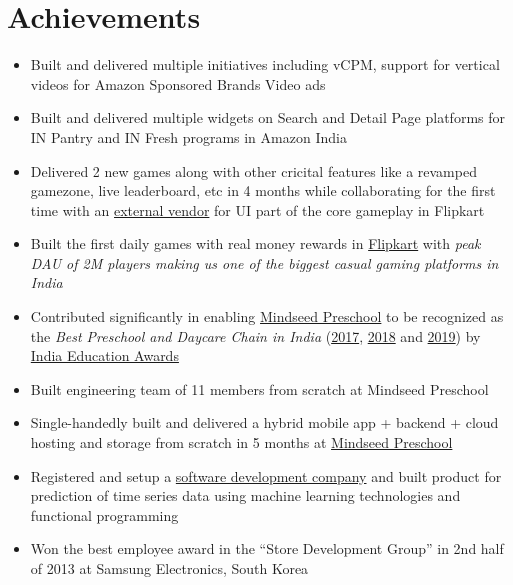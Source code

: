 \documentclass[11pt,a4paper,sans]{moderncv} %
\newcommand\Colorhref[3][blue]{\href{#2}{\small\color{#1}#3}}
\begin{document}
\section{Achievements}
\begin{itemize}
\item Built and delivered multiple initiatives including vCPM, support for vertical videos for Amazon Sponsored Brands Video ads
\item Built and delivered multiple widgets on Search and Detail Page platforms for IN Pantry and IN Fresh programs in Amazon India
\item Delivered 2 new games along with other cricital features like a revamped gamezone, live leaderboard, etc in 4 months while collaborating for the first time with an \Colorhref{https://www.juegostudio.com/}{external vendor} for UI part of the core gameplay in Flipkart
\item Built the first daily games with real money rewards in \Colorhref{https://www.flipkart.com}{Flipkart} with \textit{peak DAU of 2M players making us one of the biggest casual gaming platforms in India}
\item Contributed significantly in enabling \Colorhref{https://blog.mindseed.in}{Mindseed Preschool} to be recognized as the \textit{Best Preschool and Daycare Chain in India} (\Colorhref{http://epaperbeta.timesofindia.com/Article.aspx?eid=31804&articlexml=City-preschool-wins-top-honours-26022017105028}{2017}, \Colorhref{https://www.businesswireindia.com/actress-soha-ali-khan-felicitates-achievers-at-india-education-awards-2018-organised-by-blindwink-57760.html}{2018} and  \Colorhref{https://www.theindianwire.com/education/india-education-awards-2019-organised-blindwink-18th-aug-soha-ali-khan-presents-award-162277/}{2019}) by \Colorhref{https://indiaeducationawards.com/}{India Education Awards}
\item Built engineering team of 11 members from scratch at Mindseed Preschool
\item Single-handedly built and delivered a hybrid mobile app + backend + cloud hosting and storage from scratch in 5 months at \Colorhref{https://blog.mindseed.in}{Mindseed Preschool}
\item Registered and setup a \Colorhref{https://www.zaubacorp.com/company/GRYFFIN-SOFTWARE-DEVELOPMENT-LLP/AAC-9108}{software development company} and built product for prediction of time series data using machine learning technologies and functional programming
\item Won the best employee award in the ``Store Development Group'' in 2nd half of 2013 at Samsung Electronics, South Korea

\end{itemize}
\end{document}
